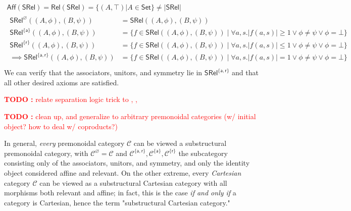 \documentclass[acmsmall,screen,review]{acmart}
\newcounter{todos}
\newcommand{\TODO}[1]{{
  \stepcounter{todos}
  \begin{center}\large{\textcolor{red}{\textbf{TODO \arabic{todos}:} #1}}\end{center}
}}
\newcommand{\mc}[1]{\ensuremath{\mathcal{#1}}}
\newcommand{\ms}[1]{\ensuremath{\mathsf{#1}}}
\begin{document}
\begin{equation}
  \begin{gathered}
  \ms{Aff}(\ms{SRel}) = \ms{Rel}(\ms{SRel}) = \{(A, \top) | A \in \ms{Set}\} \neq |\ms{SRel}|
  \\
  \begin{aligned}
    \ms{SRel}^\varnothing((A, \phi), (B, \psi))
    &= \ms{SRel}((A, \phi), (B, \psi)) \\
    \ms{SRel}^{\{\ms{a}\}}((A, \phi), (B, \psi)) 
    &= \{f \in \ms{SRel}((A, \phi), (B, \psi)) \mid \forall a, s. |f(a, s)| \geq 1 \lor \phi \neq \psi \lor \phi = \bot \} \\
    \ms{SRel}^{\{\ms{r}\}}((A, \phi), (B, \psi)) 
    &= \{f \in \ms{SRel}((A, \phi), (B, \psi)) \mid \forall a, s. |f(a, s)| \leq 1 \lor \phi \neq \psi \lor \phi = \bot \} \\
    \implies \ms{SRel}^{\{\ms{a}, \ms{r}\}}((A, \phi), (B, \psi)) 
    &= \{f \in \ms{SRel}((A, \phi), (B, \psi)) \mid \forall a, s. |f(a, s)| = 1 \lor \phi \neq \psi \lor \phi = \bot \} \\
  \end{aligned}
  \end{gathered}
\end{equation}
We can verify that the associators, unitors, and symmetry lie in \(\ms{SRel}^{\{\ms{a}, \ms{r}\}}\) and that all other desired axioms are satisfied.

\TODO{relate separation logic trick to \cite{promonad}, \cite{linear-state-usage}, \cite{mellies-ftrs}}

\TODO{clean up, and generalize to arbitrary premonoidal categories (w/ initial object? how to deal w/ coproducts?)}

In general, \textit{every} premonoidal category \(\mc{C}\) can be viewed a substructural premonoidal category, with \(\mc{C}^\varnothing = \mc{C}\) and \(\mc{C}^{\{\ms{a}, \ms{r}\}}, \mc{C}^{\{\ms{a}\}}, \mc{C}^{\{\ms{r}\}}\) the subcategory consisting only of the associators, unitors, and symmetry, and only the identity object considered affine and relevant. On the other extreme, every \textit{Cartesian} category \(\mc{C}\) can be viewed as a substructural Cartesian category with all morphisms both relevant and affine; in fact, this is the case \textit{if and only if} a category is Cartesian, hence the term "substructural Cartesian category."
\end{document}
